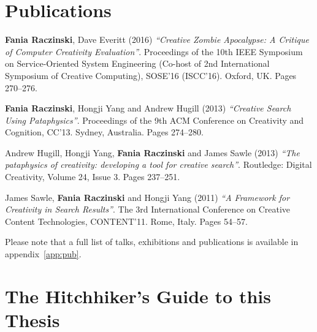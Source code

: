 \begin{comment}
  abusing tech in creative ways can yield useful results
  pataphysics = Creativity

  combining the pseudo philosophy of pataphysics with sematically structured algorithms which use programming APIs and computational linguistics to produce original creative works.

  overturn expectations
  subvert browsing
  undermine relevance
  corrupt results
\end{comment}


\section{Publications}

\textbf{Fania Raczinski}, Dave Everitt (2016) \emph{``Creative Zombie Apocalypse: A Critique of Computer Creativity Evaluation''}. Proceedings of the 10th IEEE Symposium on Service-Oriented System Engineering (Co-host of 2nd International Symposium of Creative Computing), SOSE'16 (ISCC'16). Oxford, UK. Pages 270--276.

\textbf{Fania Raczinski}, Hongji Yang and Andrew Hugill (2013) \emph{``Creative Search Using Pataphysics''}. Proceedings of the 9th ACM Conference on Creativity and Cognition, CC'13. Sydney, Australia. Pages 274--280.

Andrew Hugill, Hongji Yang, \textbf{Fania Raczinski} and James Sawle (2013) \emph{``The pataphysics of creativity: developing a tool for creative search''}. Routledge: Digital Creativity, Volume 24, Issue 3. Pages 237--251.

James Sawle, \textbf{Fania Raczinski} and Hongji Yang (2011) \emph{``A Framework for Creativity in Search Results''}. The 3rd International Conference on Creative Content Technologies, CONTENT'11. Rome, Italy. Pages 54--57.

Please note that a full list of talks, exhibitions and publications is available in appendix~\ref{app:pub}.


\section{The Hitchhiker's Guide to this Thesis}

%   

% 


